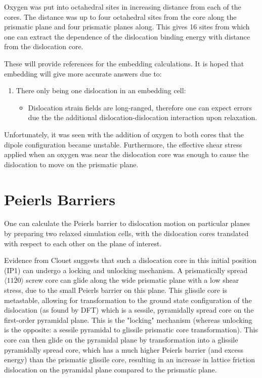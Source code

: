 \documentclass[11pt]{article}
\begin{document}
Oxygen was put into octahedral sites in increasing distance
from each of the cores. The distance was up to four octahedral sites
from the core along the prismatic plane and four prismatic planes
along. This gives 16 sites from which one can extract the
dependence of the dislocation binding energy with distance from the
dislocation core.

These will provide references for the embedding calculations. It is
hoped that embedding will give more accurate answers due to:
\begin{enumerate}
\item There only being one dislocation in an embedding cell:
\begin{itemize}
\item Dislocation strain fields are long-ranged, therefore one can
expect errors due the the additional dislocation-dislocation
interaction upon relaxation.
\end{itemize}
\end{enumerate}


Unfortunately, it was seen with the addition of oxygen to both
cores that the dipole configuration became unstable. Furthermore,
the effective shear stress applied when an oxygen was near the
dislocation core was enough to cause the dislocation to move on the
prismatic plane. 


\section{Peierls Barriers}
\label{sec:orge800bfe}

One can calculate the Peierls barrier to dislocation motion on
particular planes by preparing two relaxed simulation cells, with
the dislocation cores translated with respect to each other on the
plane of interest. 

Evidence from Clouet \cite{Clouet2015} suggests that such a
dislocation core in this initial position (IP1) can undergo a
locking and unlocking mechanism. A prismatically spread \(\langle
  11\bar{2}0 \rangle\) screw core can glide along the wide prismatic
plane with a low shear stress, due to the small Peierls barrier on
this plane. This glissile core is metastable, allowing for
transformation to the ground state configuration of the dislocation
(as found by DFT) which is a sessile, pyramidally spread core on the
first-order pyramidal plane. This is the "locking" mechanism
(whereas unlocking is the opposite: a sessile pyramidal to glissile
prismatic core transformation). This core can then glide on the
pyramidal plane by transformation into a glissile pyramidally spread
core, which has a much higher Peierls barrier (and excess energy)
than the prismatic glissile core, resulting in an increase in
lattice friction dislocation on the pyramidal plane compared to the
prismatic plane.
\end{document}
